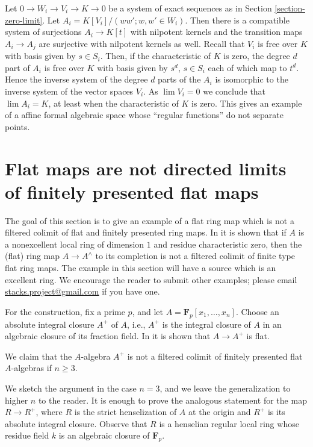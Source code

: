 \medskip\noindent
Let $0 \to W_i \to V_i \to K \to 0$ be a system of exact sequences
as in Section \ref{section-zero-limit}. Let
$A_i = K[V_i]/(ww'; w, w' \in W_i)$.
Then there is a compatible system of surjections $A_i \to K[t]$
with nilpotent kernels and
the transition maps $A_i \to A_j$ are surjective with nilpotent
kernels as well. Recall that $V_i$ is free over $K$ with
basis given by $s \in S_i$. Then, if the characteristic of $K$ is zero,
the degree $d$ part of $A_i$ is free over $K$ with basis given by
$s^d$, $s \in S_i$ each of which map to $t^d$. Hence the inverse system of
the degree $d$ parts of the $A_i$ is isomorphic to the inverse
system of the vector spaces $V_i$. As $\lim V_i = 0$ we conclude that
$\lim A_i = K$, at least when the characteristic of $K$ is zero.
This gives an example of a affine formal algebraic space
whose ``regular functions'' do not separate points.




\section{Flat maps are not directed limits of finitely presented flat maps}
\label{section-flat-not-colimit-flat-finitely-presented}

\noindent
The goal of this section is to give an example of a flat ring map which
is not a filtered colimit of flat and finitely presented ring maps. In
\cite{gabber-nonexcellent} it is shown that if $A$ is a nonexcellent
local ring of dimension $1$ and residue characteristic zero, then the
(flat) ring map $A \to A^\wedge$ to its completion is not a filtered
colimit of finite type flat ring maps. The example in this section
will have a source which is an excellent ring. We encourage the reader
to submit other examples; please email
\href{mailto:stacks.project@gmail.com}{stacks.project@gmail.com}
if you have one.

\medskip\noindent
For the construction, fix a prime $p$, and let
$A = \mathbf{F}_p[x_1, \ldots, x_n]$.
Choose an absolute integral closure $A^+$ of $A$, i.e., $A^+$ is the
integral closure of $A$ in an algebraic closure of its fraction field.
In \cite[\S 6.7]{HHBigCM} it is shown that $A \to A^+$ is flat.

\medskip\noindent
We claim that the $A$-algebra $A^+$ is not a filtered colimit of finitely
presented flat $A$-algebras if $n \geq 3$.

\medskip\noindent
We sketch the argument in the case $n = 3$, and we leave the generalization to
higher $n$ to the reader. It is enough to prove the analogous statement for
the map $R \to R^+$, where $R$ is the strict henselization of $A$ at the
origin and $R^+$ is its absolute integral closure. Observe that $R$
is a henselian regular local ring whose residue field $k$ is an
algebraic closure of $\mathbf{F}_p$.

